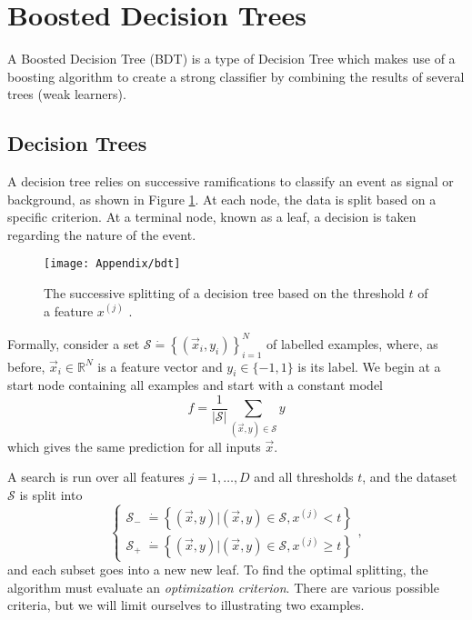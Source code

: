 \documentclass[10pt,a4paper]{book}
\begin{document}
\section{Boosted Decision Trees}
A Boosted Decision Tree (BDT) is a type of Decision Tree which makes use of a boosting algorithm to create a strong classifier by combining the results of several trees (weak learners). 

\subsection{Decision Trees}
A decision tree relies on successive ramifications to classify an event as signal or background, as shown in Figure \ref{tree}. At each node, the data is split based on a specific criterion. At a terminal node, known as a leaf, a decision is taken regarding the nature of the event.

\begin{figure}
\centering
\texttt{[image: Appendix/bdt]}
\caption{The successive splitting of a decision tree based on the threshold $t$ of a feature $x^{(j)}$ \cite{tree_image}.}
\label{tree}
\end{figure}

Formally, consider a set $\mathcal{S} \dot{=} \left\lbrace (\vec{x}_i, y_i) \right\rbrace_{i = 1}^N$ of labelled examples, where, as before, $\vec{x}_i \in \mathbb{R}^N$ is a feature vector and $y_i \in \lbrace -1, 1 \rbrace$ is its label. We begin at a start node containing all examples and start with a constant model
\begin{equation}
f = \frac{1}{\vert \mathcal{S} \vert} \sum_{(\vec{x},y) \in \mathcal{S}} y
\end{equation}
which gives the same prediction for all inputs $\vec{x}$.

A search is run over all features $j = 1, \dots, D$ and all thresholds $t$, and the dataset $\mathcal{S}$ is split into
\begin{equation}
\begin{cases}
\mathcal{S}_{-} \; \dot{=} \left\lbrace (\vec{x},y) \vert (\vec{x},y) \in \mathcal{S}, x^{(j)} < t \right\rbrace \\
\mathcal{S}_{+} \; \dot{=} \left\lbrace (\vec{x},y) \vert (\vec{x},y) \in \mathcal{S}, x^{(j)} \geq t \right\rbrace
\end{cases},
\end{equation}
and each subset goes into a new new leaf. To find the optimal splitting, the algorithm must evaluate an \emph{optimization criterion}. There are various possible criteria, but we will limit ourselves to illustrating two examples.
\end{document}
